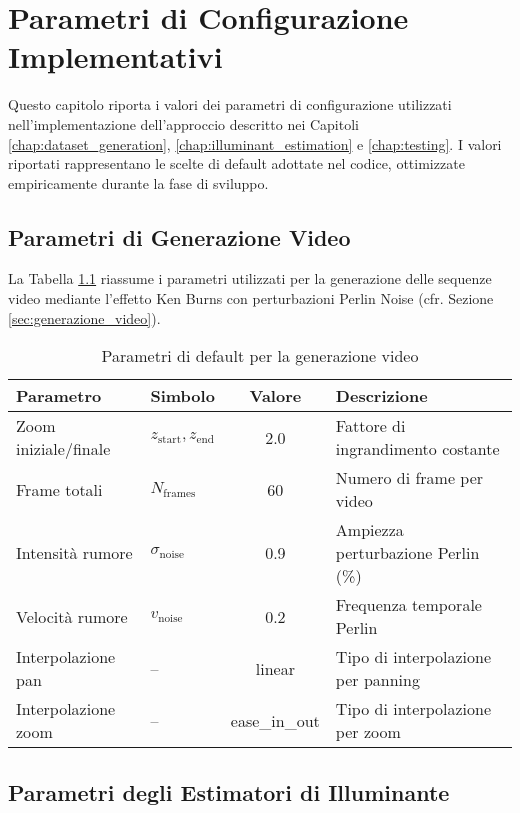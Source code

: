 \chapter{Parametri di Configurazione Implementativi}\label{app:params}

Questo capitolo riporta i valori dei parametri di configurazione utilizzati nell'implementazione dell'approccio descritto nei Capitoli \ref{chap:dataset_generation}, \ref{chap:illuminant_estimation} e \ref{chap:testing}. I valori riportati rappresentano le scelte di default adottate nel codice, ottimizzate empiricamente durante la fase di sviluppo.

\section{Parametri di Generazione Video}\label{app:video_params}

La Tabella \ref{tab:video_params} riassume i parametri utilizzati per la generazione delle sequenze video mediante l'effetto Ken Burns con perturbazioni Perlin Noise (cfr. Sezione \ref{sec:generazione_video}).

\begin{table}[htbp]
\centering
\caption{Parametri di default per la generazione video}
\label{tab:video_params}
\begin{tabular}{llcp{6cm}}
\toprule
\textbf{Parametro} & \textbf{Simbolo} & \textbf{Valore} & \textbf{Descrizione} \\
\midrule
Zoom iniziale/finale & $z_{\text{start}}, z_{\text{end}}$ & 2.0 & Fattore di ingrandimento costante \\
Frame totali & $N_{\text{frames}}$ & 60 & Numero di frame per video \\
Intensità rumore & $\sigma_{\text{noise}}$ & 0.9 & Ampiezza perturbazione Perlin (\%) \\
Velocità rumore & $v_{\text{noise}}$ & 0.2 & Frequenza temporale Perlin \\
Interpolazione pan & -- & linear & Tipo di interpolazione per panning \\
Interpolazione zoom & -- & ease\_in\_out & Tipo di interpolazione per zoom \\
\bottomrule
\end{tabular}
\end{table}

\section{Parametri degli Estimatori di Illuminante}\label{app:estimator_params}

